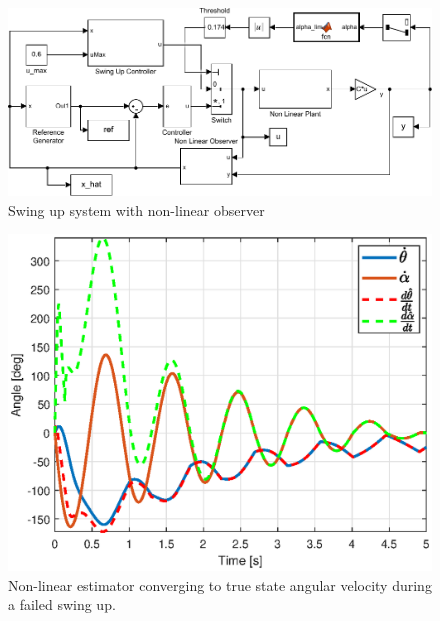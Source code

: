 \documentclass[superscriptaddress,floatfix,reprint,amssymb, amsmath,aps, pre]{revtex4-1}
\begin{document}
{{{            \begin{figure}[t!]
                \includegraphics[width = \linewidth]{SwingUpSystemNonLin.pdf}
                \caption{Swing up system with non-linear observer}
                \label{fig:SwingUpSystemNonLin}
            \end{figure}

            \begin{figure}
                \includegraphics[width = \linewidth]{SwingupfailVel.eps}
                \caption{Non-linear estimator converging to true state angular velocity during a failed swing up.}
                \label{fig:SwingupfailVel}
            \end{figure}

}}}
\end{document}
